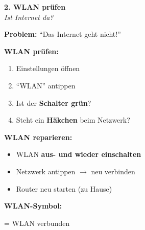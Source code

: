 \documentclass[a4paper,landscape,8pt]{extarticle}
\begin{document}
\hfill%
\begin{minipage}[t]{0.32\linewidth}
\begin{center}
\colorbox{wlangreen!15}{%
\begin{minipage}{0.95\linewidth}
\vspace{2mm}
\begin{center}
{\Large\bfseries\textcolor{wlangreen}{2. WLAN prüfen}}\\[1pt]
{\footnotesize\itshape Ist Internet da?}
\end{center}
\vspace{2mm}
\end{minipage}%
}
\end{center}

\vspace{1mm}

\textbf{Problem:} ``Das Internet geht nicht!''

\textbf{WLAN prüfen:}
\begin{enumerate}
\item Einstellungen öffnen
\item ``WLAN'' antippen
\item Ist der \textbf{Schalter grün}?
\item Steht ein \textbf{Häkchen} beim Netzwerk?
\end{enumerate}

\textbf{WLAN reparieren:}
\begin{itemize}
\item WLAN \textbf{aus- und wieder einschalten}
\item Netzwerk antippen $\rightarrow$ neu verbinden
\item Router neu starten (zu Hause)
\end{itemize}

\vspace{2mm}

\vspace{2mm}

\textbf{WLAN-Symbol:}\\
= WLAN verbunden

\end{minipage}%
\end{document}
